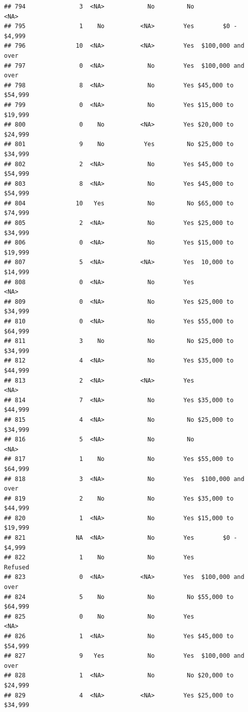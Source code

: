\documentclass[man]{apa6}
\begin{document}
\begin{verbatim}
## 794               3  <NA>            No         No               <NA>
## 795               1    No          <NA>        Yes        $0 - $4,999
## 796              10  <NA>          <NA>        Yes  $100,000 and over
## 797               0  <NA>            No        Yes  $100,000 and over
## 798               8  <NA>            No        Yes $45,000 to $54,999
## 799               0  <NA>            No        Yes $15,000 to $19,999
## 800               0    No          <NA>        Yes $20,000 to $24,999
## 801               9    No           Yes         No $25,000 to $34,999
## 802               2  <NA>            No        Yes $45,000 to $54,999
## 803               8  <NA>            No        Yes $45,000 to $54,999
## 804              10   Yes            No         No $65,000 to $74,999
## 805               2  <NA>            No        Yes $25,000 to $34,999
## 806               0  <NA>            No        Yes $15,000 to $19,999
## 807               5  <NA>          <NA>        Yes  10,000 to $14,999
## 808               0  <NA>            No        Yes               <NA>
## 809               0  <NA>            No        Yes $25,000 to $34,999
## 810               0  <NA>            No        Yes $55,000 to $64,999
## 811               3    No            No         No $25,000 to $34,999
## 812               4  <NA>            No        Yes $35,000 to $44,999
## 813               2  <NA>          <NA>        Yes               <NA>
## 814               7  <NA>            No        Yes $35,000 to $44,999
## 815               4  <NA>            No         No $25,000 to $34,999
## 816               5  <NA>            No         No               <NA>
## 817               1    No            No        Yes $55,000 to $64,999
## 818               3  <NA>            No        Yes  $100,000 and over
## 819               2    No            No        Yes $35,000 to $44,999
## 820               1  <NA>            No        Yes $15,000 to $19,999
## 821              NA  <NA>            No        Yes        $0 - $4,999
## 822               1    No            No        Yes            Refused
## 823               0  <NA>          <NA>        Yes  $100,000 and over
## 824               5    No            No         No $55,000 to $64,999
## 825               0    No            No        Yes               <NA>
## 826               1  <NA>            No        Yes $45,000 to $54,999
## 827               9   Yes            No        Yes  $100,000 and over
## 828               1  <NA>            No         No $20,000 to $24,999
## 829               4  <NA>          <NA>        Yes $25,000 to $34,999

\end{verbatim}
\end{document}
